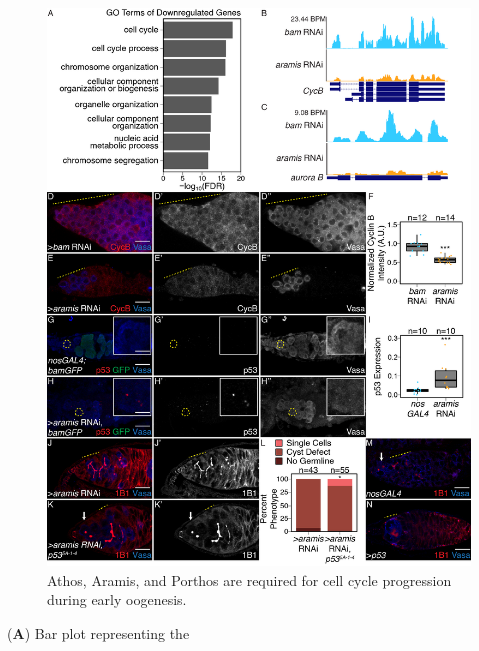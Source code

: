 \documentclass[12pt,oneside]{reedthesis}
\begin{document}
\begin{figure}

{\centering \includegraphics[width=6.5 in,height=8.9375 in]{./figure/Ribosome Biogenesis/Ribosome Biogenesis 3} 

}

\caption[Athos, Aramis, and Porthos are required for cell cycle progression during early oogenesis.]{Athos, Aramis, and Porthos are required for cell cycle progression during early oogenesis.}\label{fig:unnamed-chunk-10}
\end{figure}
(\textbf{A}) Bar plot representing the
\end{document}
